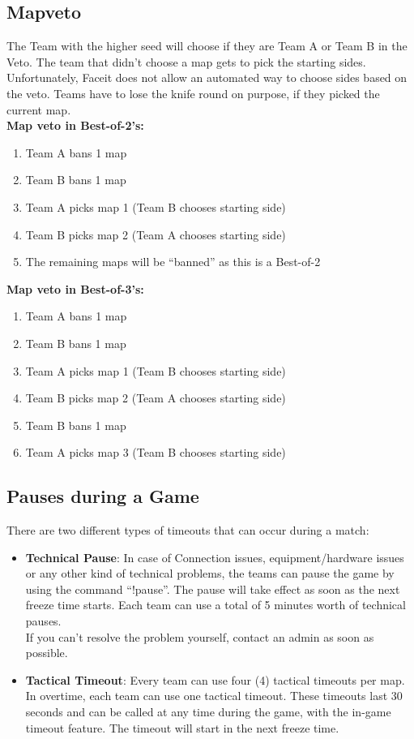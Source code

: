 \documentclass{article}
\begin{document}
\subsection{Mapveto}
\newcommand{\TeamA}{{\color{red}Team A }}
\newcommand{\TeamB}{{\color{blue}Team B }}
The Team with the higher seed will choose if they are \TeamA or \TeamB in the Veto. The team that didn't choose a map gets to pick the starting sides. Unfortunately, Faceit does not allow an automated way to choose sides based on the veto. Teams have to lose the knife round on purpose, if they picked the current map.\\

\textbf{Map veto in Best-of-2's:}
\begin{enumerate}
    \item \TeamA bans 1 map
    \item \TeamB bans 1 map
    \item \TeamA picks map 1 (\TeamB chooses starting side)
    \item \TeamB picks map 2 (\TeamA chooses starting side)
    \item The remaining maps will be “banned” as this is a Best-of-2
\end{enumerate}

\textbf{Map veto in Best-of-3's:}
\begin{enumerate}
    \item \TeamA bans 1 map
    \item \TeamB bans 1 map
    \item \TeamA picks map 1 (\TeamB chooses starting side)
    \item \TeamB picks map 2 (\TeamA chooses starting side)
    \item \TeamB bans 1 map
    \item \TeamA picks map 3 (\TeamB chooses starting side)
\end{enumerate}

\subsection{Pauses during a Game}
There are two different types of timeouts that can occur during a match:
\begin{itemize}
    \item \textbf{Technical Pause}: In case of Connection issues, equipment/hardware issues or any other kind of technical problems, the teams can pause the game by using the command “!pause”. The pause will take effect as soon as the next freeze time starts. Each team can use a total of 5 minutes worth of technical pauses.\\
    If you can't resolve the problem yourself, contact an admin as soon as possible.
    \item \textbf{Tactical Timeout}: Every team can use four (4) tactical timeouts per map. In overtime, each team can use one tactical timeout. These timeouts last 30 seconds and can be called at any time during the game, with the in-game timeout feature. The timeout will start in the next freeze time.

\end{itemize}
\end{document}

